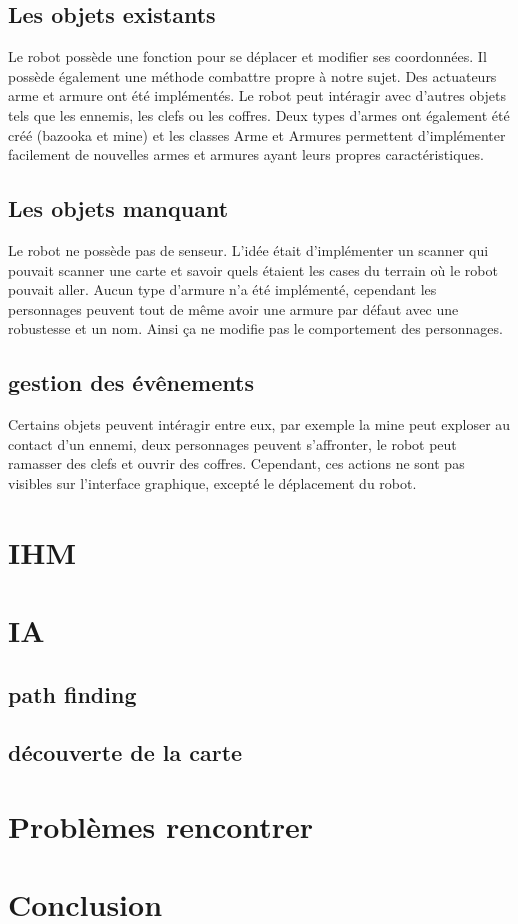 \documentclass[a4paper 12pts]{article}
\begin{document}
\subsection{Les objets existants}
Le robot possède une fonction pour se déplacer et modifier ses coordonnées. Il possède également une méthode combattre propre à notre sujet. Des actuateurs arme et armure ont été implémentés. Le robot peut intéragir avec d'autres objets tels que les ennemis, les clefs ou les coffres. Deux types d'armes ont également été créé (bazooka et mine) et les classes Arme et Armures permettent d'implémenter facilement de nouvelles armes et armures ayant leurs propres caractéristiques.

\subsection{Les objets manquant}
Le robot ne possède pas de senseur. L'idée était d'implémenter un scanner qui pouvait scanner une carte et savoir quels étaient les cases du terrain où le robot pouvait aller. Aucun type d'armure n'a été implémenté, cependant les personnages peuvent tout de même avoir une armure par défaut avec une robustesse et un nom. Ainsi ça ne modifie pas le comportement des personnages.

\subsection{gestion des évênements}
Certains objets peuvent intéragir entre eux, par exemple la mine peut exploser au contact d'un ennemi, deux personnages peuvent s'affronter, le robot peut ramasser des clefs et ouvrir des coffres. Cependant, ces actions ne sont pas visibles sur l'interface graphique, excepté le déplacement du robot.

\section{IHM}


\newpage
\section{IA}


\subsection{path finding}
\subsection{découverte de la carte}


\newpage
\section{Problèmes rencontrer}


\section{Conclusion}
\end{document}
